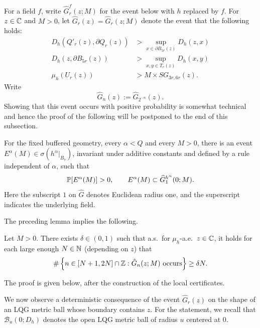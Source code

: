\documentclass[12pt]{amsart}
\numberwithin{equation}{section}
\newcommand{\SGann}[2]{\hyperref[eq:alternate-size-2-full]{SG_{#1}(#2)}}
\begin{document}
	For a field $f$, write $\widehat G_r^f(z;M)$ for the event below with $h$ replaced by $f$. For $z\in\C$ and $M>0$, let $\hat G_r(z) = \hat G_r(z; M)$ denote the event that the following holds:
	\begin{equation}\label{eq:pinch-point-event}
	\begin{aligned}
	D_h(Q'_r(z), \partial Q_r(z)) &> \sup_{x \in \partial B_{5 r}(z)} D_h(z, x) \\
	D_h(z, \partial B_{5 r}(z)) &>  \sup_{x, y \in T_r(z)} D_h(x, y) \\
	\mu_h(U_r(z)) &> M \times \SGann{3r,6r}{z} .
	\end{aligned}
	\end{equation}
	Write 
	\[
	\hat G_n(z) := \hat G_{2^{-n}}(z) .
	\]
	Showing that this event occurs with positive probability is somewhat technical and hence the proof of the following will be postponed to the end of this subsection.  
\begin{lemma} \label{lemma:mu_h-pinch-positive-probability}
For the fixed buffered geometry, every $\alpha<Q$ and every $M>0$, there is an event $E^\alpha(M)\in\sigma(h^\alpha|_{B_7})$, invariant under additive constants and defined by a rule independent of $\alpha$, such that
\[
 \P[E^\alpha(M)]>0,\qquad E^\alpha(M)\subset\widehat G_1^{h^\alpha}(0;M).
\]
Here the subscript $1$ on $\widehat G$ denotes Euclidean radius one, and the superscript indicates the underlying field.
\end{lemma}
	The preceding lemma implies the following. 
	
	
	
	
	\begin{lemma} \label{lemma:mu_h-pinch-bad}
		Let $M > 0$. There exists $\delta \in (0,1)$ such that a.s.\ for $\mu_h$-a.e.\ $z\in  \C$, it holds for each large enough $N\in \N$ (depending on $z$) that
		\begin{equation} \label{eq:mu_h-pinch-bad}
		\#\left\{ n \in [N+1,2N]\cap \Z  : \mbox{$\hat G_n(z; M)$ occurs} \right\}  \geq \delta N.
		\end{equation}  
	\end{lemma}
	The proof is given below, after the construction of the local certificates.

	
	
	We now observe a deterministic consequence of the event $\hat G_r(z)$ on the shape of an LQG metric ball whose boundary contains $z$. For the statement, we recall that $\mathcal B_u(0;D_h)$ denotes the open LQG metric ball of radius $u$ centered at 0.
	
\end{document}
